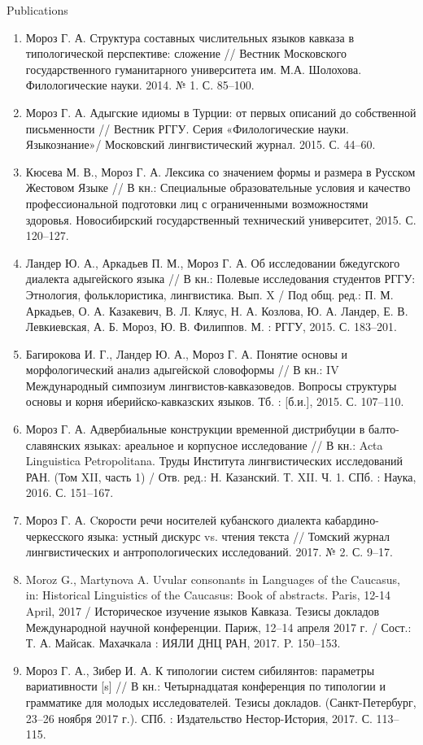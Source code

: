 \documentclass{resume} %
\begin{document}
\begin{rSection}{Publications}
\begin{enumerate}
\item Мороз Г. А. Структура составных числительных языков кавказа в типологической перспективе: сложение // Вестник Московского государственного гуманитарного университета им. М.А. Шолохова. Филологические науки. 2014. № 1. С. 85--100.
\item Мороз Г. А. Адыгские идиомы в Турции: от первых описаний до собственной письменности // Вестник РГГУ. Серия «Филологические науки. Языкознание»/ Московский лингвистический журнал. 2015. С. 44--60.
\item Кюсева М. В., Мороз Г. А. Лексика со значением формы и размера в Русском Жестовом Языке // В кн.: Специальные образовательные условия и качество профессиональной подготовки лиц с ограниченными возможностями здоровья. Новосибирский государственный технический университет, 2015. С. 120--127.
\item Ландер Ю. А., Аркадьев П. М., Мороз Г. А. Об исследовании бжедугского диалекта адыгейского языка // В кн.: Полевые исследования студентов РГГУ: Этнология, фольклористика, лингвистика. Вып. X / Под общ. ред.: П. М. Аркадьев, О. А. Казакевич, В. Л. Кляус, Н. А. Козлова, Ю. А. Ландер, Е. В. Левкиевская, А. Б. Мороз, Ю. В. Филиппов. М. : РГГУ, 2015. С. 183--201.
\item Багирокова И. Г., Ландер Ю. А., Мороз Г. А. Понятие основы и морфологический анализ адыгейской словоформы // В кн.: IV Международный симпозиум лингвистов-кавказоведов. Вопросы структуры основы и корня иберийско-кавказских языков. Тб. : [б.и.], 2015. С. 107--110.
\item Мороз Г. А. Адвербиальные конструкции временной дистрибуции в балто-славянских языках: ареальное и корпусное исследование // В кн.: Acta Linguistica Petropolitana. Труды Института лингвистических исследований РАН. (Том XII, часть 1) / Отв. ред.: Н. Казанский. Т. XII. Ч. 1. СПб. : Наука, 2016. С. 151--167.
\item Мороз Г. А. Cкорости речи носителей кубанского диалекта кабардино-черкесского языка: устный дискурс vs. чтения текста // Томский журнал лингвистических и антропологических исследований. 2017. №  2. С. 9--17.
\item Moroz G., Martynova A. Uvular consonants in Languages of the Caucasus, in: Historical Linguistics of the Caucasus: Book of abstracts. Paris, 12-14 April, 2017 / Историческое изучение языков Кавказа. Тезисы докладов Международной научной конференции. Париж, 12--14 апреля 2017 г. / Сост.: Т. А. Майсак. Махачкала : ИЯЛИ ДНЦ РАН, 2017. P. 150--153.
\item Мороз Г. А., Зибер И. А. К типологии систем сибилянтов: параметры вариативности [s] // В кн.: Четырнадцатая конференция по типологии и грамматике для молодых исследователей. Тезисы докладов. (Санкт-Петербург, 23--26 ноября 2017 г.). СПб. : Издательство Нестор-История, 2017. С. 113--115.

\end{enumerate}
\end{rSection}
\end{document}
